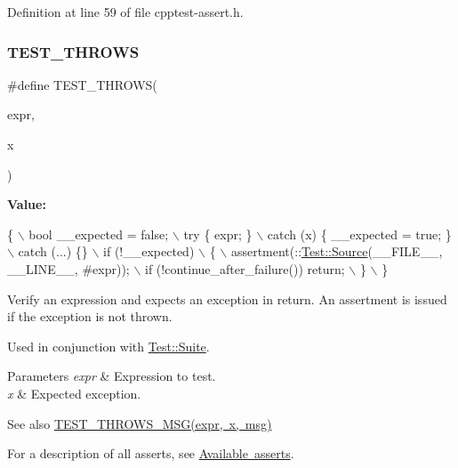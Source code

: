 Definition at line 59 of file cpptest-\/assert.\+h.

\mbox{\label{cpptest-assert_8h_a5174c5f93519d5726c8993b2f36d6ceb}} 
\subsubsection{\texorpdfstring{T\+E\+S\+T\+\_\+\+T\+H\+R\+O\+WS}{TEST\_THROWS}}
{\footnotesize\ttfamily \#define T\+E\+S\+T\+\_\+\+T\+H\+R\+O\+WS(\begin{DoxyParamCaption}\item[{}]{expr,  }\item[{}]{x }\end{DoxyParamCaption})}

{\bfseries Value\+:}
\begin{DoxyCode}
\{                                                               \(\backslash\)
        bool \_\_expected = \textcolor{keyword}{false};                                    \(\backslash\)
        try \{ expr; \}                                               \(\backslash\)
        catch (x)           \{ \_\_expected = \textcolor{keyword}{true}; \}                  \(\backslash\)
        catch (...)         \{\}                                      \(\backslash\)
        if (!\_\_expected)                                            \(\backslash\)
        \{                                                           \(\backslash\)
            assertment(::\mbox{\hyperlink{class_test_1_1_source}{Test::Source}}(\_\_FILE\_\_, \_\_LINE\_\_, #expr));  \(\backslash\)
            if (!continue\_after\_failure()) return;                  \(\backslash\)
        \}                                                           \(\backslash\)
    \}
\end{DoxyCode}
Verify an expression and expects an exception in return. An assertment is issued if the exception is not thrown.

Used in conjunction with \mbox{\hyperlink{class_test_1_1_suite}{Test\+::\+Suite}}.


\begin{DoxyParams}{Parameters}
{\em expr} & Expression to test. \\
\hline
{\em x} & Expected exception.\\
\hline
\end{DoxyParams}
\begin{DoxySeeAlso}{See also}
\mbox{\hyperlink{cpptest-assert_8h_a1ce6abe9e9134ce993840a648673e0f2}{T\+E\+S\+T\+\_\+\+T\+H\+R\+O\+W\+S\+\_\+\+M\+S\+G(expr, x, msg)}}
\end{DoxySeeAlso}
For a description of all asserts, see \mbox{\hyperlink{asserts}{Available asserts}}. 

